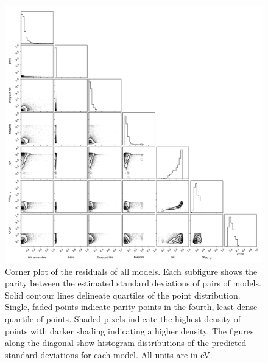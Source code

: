 \documentclass[]{achemso}
\begin{document}
\begin{figure}
    \centering
    \includegraphics[width=\textwidth]{corners/stdev_correlations.pdf}
    \caption{Corner plot of the residuals of all models.
        Each subfigure shows the parity between the estimated standard deviations of pairs of models.
        Solid contour lines delineate quartiles of the point distribution.
        Single, faded points indicate parity points in the fourth, least dense quartile of points.
        Shaded pixels indicate the highest density of points with darker shading indicating a higher density.
        The figures along the diagonal show histogram distributions of the predicted standard deviations for each model.
        All units are in eV.
        }\label{fig:stdevs}
\end{figure}
\end{document}
